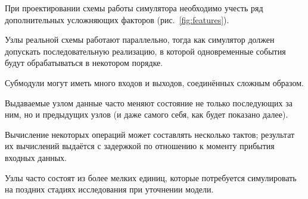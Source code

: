 При проектировании схемы работы симулятора необходимо учесть ряд дополнительных усложняющих факторов (рис.~\ref{fig:features}).

\begin{itemize*}
    \item Узлы реальной схемы работают параллельно, тогда как симулятор должен допускать последовательную реализацию, в которой одновременные события будут обрабатываться в некотором порядке.
    \item Субмодули могут иметь много входов и выходов, соединённых сложным образом.
    \item Выдаваемые узлом данные часто меняют состояние не только последующих за ним, но и предыдущих узлов (и даже самого себя, как будет показано далее).
    \item Вычисление некоторых операций может составлять несколько тактов; результат их вычислений выдаётся с задержкой по отношению к моменту прибытия входных данных.
    \item Узлы часто состоят из более мелких единиц, которые потребуется симулировать на поздних стадиях исследования при  уточнении модели.
\end{itemize*}


